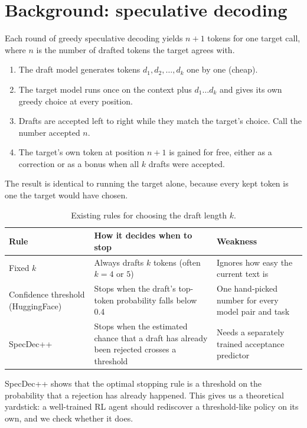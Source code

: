 \section{Background: speculative decoding}

Each round of greedy speculative decoding yields $n+1$ tokens for one target call, where $n$ is the number of drafted tokens the target agrees with.
\begin{enumerate}
  \item The draft model generates tokens $d_1, d_2, \dots, d_k$ one by one (cheap).
  \item The target model runs once on the context plus $d_1 \dots d_k$ and gives its own greedy choice at every position.
  \item Drafts are accepted left to right while they match the target's choice. Call the number accepted $n$.
  \item The target's own token at position $n+1$ is gained for free, either as a correction or as a bonus when all $k$ drafts were accepted.
\end{enumerate}
The result is identical to running the target alone, because every kept token is one the target would have chosen.

\begin{table}[h]
\centering
\caption{Existing rules for choosing the draft length $k$.}
\label{tab:existing-rules}
\begin{tabularx}{\linewidth}{@{}lXX@{}}
\toprule
Rule & How it decides when to stop & Weakness \\
\midrule
Fixed $k$ & Always drafts $k$ tokens (often $k=4$ or $5$) & Ignores how easy the current text is \\
Confidence threshold (HuggingFace)~\citep{hfdynamic} & Stops when the draft's top-token probability falls below 0.4 & One hand-picked number for every model pair and task \\
SpecDec++~\citep{huang2024specdecpp} & Stops when the estimated chance that a draft has already been rejected crosses a threshold & Needs a separately trained acceptance predictor \\
\bottomrule
\end{tabularx}
\end{table}

SpecDec++ shows that the optimal stopping rule is a threshold on the probability that a rejection has already happened. This gives us a theoretical yardstick: a well-trained RL agent should rediscover a threshold-like policy on its own, and we check whether it does.
